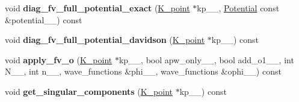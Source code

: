 \begin{DoxyCompactItemize}
\item 
\hypertarget{classsirius_1_1_band_ac40cf723a2b465fe5a38f9351b56c6a0}{}void {\bfseries diag\+\_\+fv\+\_\+full\+\_\+potential\+\_\+exact} (\hyperlink{classsirius_1_1_k__point}{K\+\_\+point} $\ast$kp\+\_\+\+\_\+, \hyperlink{classsirius_1_1_potential}{Potential} const \&potential\+\_\+\+\_\+) const \label{classsirius_1_1_band_ac40cf723a2b465fe5a38f9351b56c6a0}

\item 
\hypertarget{classsirius_1_1_band_a5ee9cb3f4354926d3f391ad0b72599fc}{}void {\bfseries diag\+\_\+fv\+\_\+full\+\_\+potential\+\_\+davidson} (\hyperlink{classsirius_1_1_k__point}{K\+\_\+point} $\ast$kp\+\_\+\+\_\+) const \label{classsirius_1_1_band_a5ee9cb3f4354926d3f391ad0b72599fc}

\item 
\hypertarget{classsirius_1_1_band_a1c92f82ee4f3031e8ba98348cd9b304e}{}void {\bfseries apply\+\_\+fv\+\_\+o} (\hyperlink{classsirius_1_1_k__point}{K\+\_\+point} $\ast$kp\+\_\+\+\_\+, bool apw\+\_\+only\+\_\+\+\_\+, bool add\+\_\+o1\+\_\+\+\_\+, int N\+\_\+\+\_\+, int n\+\_\+\+\_\+, wave\+\_\+functions \&phi\+\_\+\+\_\+, wave\+\_\+functions \&ophi\+\_\+\+\_\+) const \label{classsirius_1_1_band_a1c92f82ee4f3031e8ba98348cd9b304e}

\item 
\hypertarget{classsirius_1_1_band_a295e3191e6b16233f9ce289aadc3df27}{}void {\bfseries get\+\_\+singular\+\_\+components} (\hyperlink{classsirius_1_1_k__point}{K\+\_\+point} $\ast$kp\+\_\+\+\_\+) const \label{classsirius_1_1_band_a295e3191e6b16233f9ce289aadc3df27}


\end{DoxyCompactItemize}
